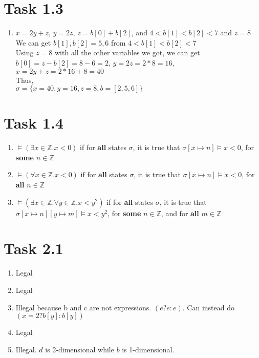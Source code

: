 \documentclass{article}
\newcommand{\Z}{\mathbb{Z}}
\newcommand{\answer}{\item[]} %
\begin{document}
	\section{Task 1.3}
		\begin{enumerate}[label={(\alph*)}]
			
			\answer
			$x = 2y + z$, $y = 2z$, $z = b[0] + b[2]$, and $4 < b[1] < b[2] < 7$ and $z = 8$ \\
			We can get $b[1], b[2] = 5, 6$ from $4 < b[1] < b[2] < 7$ \\
			Using $z = 8$ with all the other variables we got, we can get $b[0] = z - b[2] = 8 - 6 = 2$, $y = 2z = 2 * 8 = 16$, $x = 2y + z = 2 * 16 + 8 = 40$ \\
			Thus, \\
			$\sigma = \{x = 40, y = 16, z = 8, b = [2, 5, 6] \}$
			
		\end{enumerate}
	
	\section{Task 1.4}
	\begin{enumerate}[label={(\alph*)}]
		
		\item $\models (\exists x \in \Z . x < 0)$ if for \textbf{all} states $\sigma$, it is true that $\sigma [x \mapsto n] \models x < 0$, for \textbf{some} $n \in \Z$
		
		\item $\models (\forall x \in \Z . x < 0)$ if for \textbf{all} states $\sigma$, it is true that $\sigma [x \mapsto n] \models x < 0$, for \textbf{all} $n \in \Z$
		
		\item $\models (\exists x \in \Z . \forall y \in \Z . x < y^2)$ if for \textbf{all} states $\sigma$, it is true that $\sigma [x \mapsto n] [y \mapsto m] \models x < y^2$, for \textbf{some} $n \in \Z$, and for \textbf{all} $m \in \Z$
		
	\end{enumerate}
		
	\pagebreak
	
	\section{Task 2.1}
		\begin{enumerate}[label = {(\alph*)}]
			
			\item Legal
			
			\item Legal
			
			\item Illegal because b and c are not expressions. $(e ? e : e)$. Can instead do $(x = 2 ? b[y] : b[y])$
			
			\item Legal
			
			\item Illegal. $d$ is 2-dimensional while $b$ is 1-dimensional.
			
		\end{enumerate}
	
\end{document}
